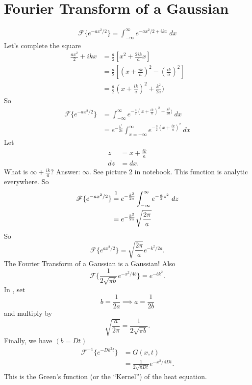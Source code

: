 \documentclass[cm]{article}
\renewcommand{\F}{\mathscr F}
\renewcommand{\infint}{\int_{-\infty}^{\infty}}
\begin{document}
\section{Fourier Transform of a Gaussian}
\begin{align*}
\F \{ e^{-ax^2/2} \} = \infint e^{-ax^2/2 + ikx}~dx
\end{align*}
Let's complete the square
\begin{align*}
\frac{ax^2}{2} + ikx &= \frac{a}{2} [x^2 + \frac{2i k}{a} x] \\
&= \frac{a}{2} [ (x + \frac{ik}{a})^2 - (\frac{ik}{a})^2] \\
&= \frac{a}{2} (x + \frac{ik}{a})^2 + \frac{k^2}{2a})
\end{align*}
So
\begin{align*}
\F \{ e^{-ax^2/2}\} &= \infint e^{-  \frac{a}{2} (x + \frac{ik}{a})^2 + \frac{k^2}{2a})}~dx \\
&= e^{-\frac{k^2}{2a}} \int_{x = - \infty}^{\infty} e^{- \frac{a}{2} (x + \frac{ik}{a})^2}~dx
\end{align*}
Let 
\begin{align*}
z &= x + \frac{ik}{a} \\
dz &= dx.
\end{align*}
What is $\infty + \frac{ik}{a}$? Answer: $\infty$. See picture 2 in notebook. This function is analytic everywhere. So
\begin{align*}
\F \{ e^{-ax^2/2} \}&\stackrel{\footnotemark}{=} e^{-\frac{k^2}{2a}} \infint e^{- \frac{a}{2} z^2} ~dz \\
&= e^{- \frac{k^2}{2a}} \sqrt{\frac{ 2 \pi}{a}}
\end{align*}
So
\begin{equation*}
\F \{ e^{a x^2/2} \} = \sqrt{ \frac{2 \pi}{a}} e^{-k^2/2a}. \tag{\smiley}
\end{equation*}
The Fourier Transform of a Gaussian is a Gaussian! 
Also
$$\F \{ \frac{1}{2\sqrt{\pi b}} e^{-x^2/4b} \} = e^{-bk^2}.$$
In \smiley, set
$$b = \frac{1}{2a} \implies a = \frac{1}{2b}$$
and multiply by
$$ \sqrt{\frac{a}{2\pi}} = \frac{1}{2 \sqrt{\pi b}}.$$
Finally, we have $(b = Dt)$
\begin{align*}
\F^{-1} \{ e^{-Dk^2 t}\} &= G(x,t) \\ 
&= \frac{1}{2 \sqrt{\pi D t}} e^{-x^2 / 4 Dt}.
\end{align*}
This is the Green's function (or the ``Kernel'') of the heat equation.
\end{document}
